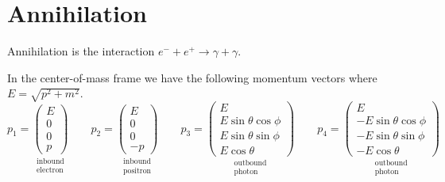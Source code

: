 

\section*{Annihilation}

Annihilation is the interaction $e^-+e^+\rightarrow\gamma+\gamma$.
%
\begin{center}
\end{center}
%
In the center-of-mass frame we have the following momentum vectors where $E=\sqrt{p^2+m^2}$.
\begin{equation*}
p_1=\underset{\substack{\text{inbound}\\ \text{electron}}}
{\begin{pmatrix}E\\0\\0\\p\end{pmatrix}}
\qquad
p_2=\underset{\substack{\text{inbound}\\ \text{positron}}}
{\begin{pmatrix}E\\0\\0\\-p\end{pmatrix}}
\qquad
p_3=\underset{\substack{\text{outbound}\\ \text{photon}}}
{\begin{pmatrix}E\\ E\sin\theta\cos\phi\\ E\sin\theta\sin\phi\\ E\cos\theta\end{pmatrix}}
\qquad
p_4=\underset{\substack{\text{outbound}\\ \text{photon}}}
{\begin{pmatrix}E\\ -E\sin\theta\cos\phi\\ -E\sin\theta\sin\phi\\ -E\cos\theta\end{pmatrix}}
\end{equation*}

